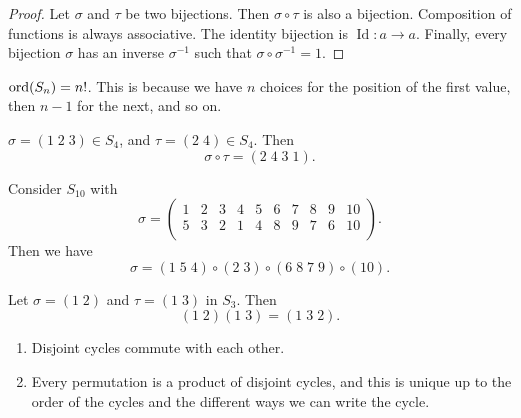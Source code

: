 \begin{proof}
    Let $\sigma$ and $\tau$ be two bijections.
    Then $\sigma \circ \tau$ is also a bijection.
    Composition of functions is always associative.
    The identity bijection is $\operatorname{Id}: a \to a$.
    Finally, every bijection $\sigma$ has an inverse $\sigma^{-1}$
    such that $\sigma \circ \sigma^{-1} = 1$.
\end{proof}

\begin{remark}
    $\operatorname{ord}(S_n) = n!$. This is because we have $n$ choices for the
    position of the first value, then $n-1$ for the next, and so on.
\end{remark}

\begin{example}
    $\sigma = (1\;2\;3) \in S_4$, and $\tau = (2\;4) \in S_4$.
    Then
    \[
        \sigma \circ \tau = (2 \; 4 \; 3 \; 1).
    \]
\end{example}

\begin{example}
    Consider $S_{10}$ with
    \[
        \sigma =
        \begin{pmatrix}
            1 & 2 & 3 & 4 & 5 & 6 & 7 & 8 & 9 & 10 \\
            5 & 3 & 2 & 1 & 4 & 8 & 9 & 7 & 6 & 10 \\
        \end{pmatrix}
        .
    \]
    Then we have
    \[
        \sigma = (1\;5\;4)\circ(2\;3)\circ(6\;8\;7\;9)\circ(10).
    \]
\end{example}

\begin{example}
    Let $\sigma = (1\;2)$ and $\tau = (1\;3)$ in $S_3$.
    Then
    \[
        (1\;2)(1\;3) = (1\;3\;2).
    \]
\end{example}

\begin{proposition}[]
    \hfill
    \begin{enumerate}
        \item Disjoint cycles commute with each other.
        \item Every permutation is a product of disjoint cycles,
            and this is unique up to the order of the cycles
            and the different ways we can write the cycle.
    \end{enumerate}
\end{proposition}
